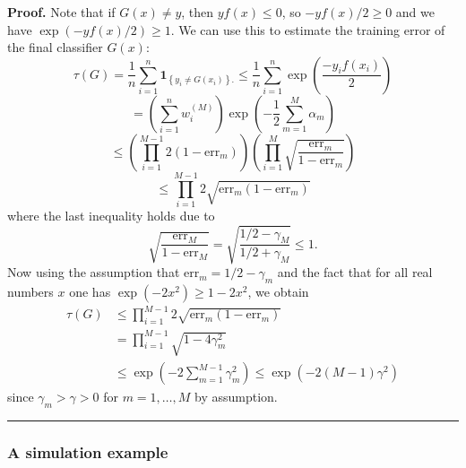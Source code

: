 \documentclass[11pt,twoside]{article}%
\theoremstyle{change}
\newenvironment{proof}[1][Proof]{\textbf{#1.} }{\ \rule{0.5em}{0.5em}}
\begin{document}
\begin{proof}
Note that if $G(x)\neq y$, then $yf(x)\leq0$, so $-yf(x)/2\geq0$ and we have
$\exp\left(  -yf(x)/2\right)  \geq1$. We can use this to estimate the training
error of the final classifier $G(x)$:%
\[
\tau(G)=\frac{1}{n}\sum_{i=1}^{n}\mathbf{1}_{\left\{  y_{i}\neq G(x_{i}%
)\right\}  .}\leq\frac{1}{n}\sum_{i=1}^{n}\exp\left(  \frac{-y_{i}f(x_{i})}%
{2}\right)
\]%
\[
=\left(  \sum_{i=1}^{n}w_{i}^{(M)}\right)  \exp\left(  -\frac{1}{2}\sum
_{m=1}^{M}\alpha_{m}\right)
\]%
\[
\leq\left(
{\displaystyle\prod\limits_{i=1}^{M-1}}
2\left(  1-\mathrm{err}_{m}\right)  \right)  \left(
{\displaystyle\prod\limits_{i=1}^{M}}
\sqrt{\frac{\mathrm{err}_{m}}{1-\mathrm{err}_{m}}}\right)
\]%
\[
\leq%
{\displaystyle\prod\limits_{i=1}^{M-1}}
2\sqrt{\mathrm{err}_{m}\left(  1-\mathrm{err}_{m}\right)  }%
\]
where the last inequality holds due to
\[
\sqrt{\frac{\mathrm{err}_{M}}{1-\mathrm{err}_{M}}}=\sqrt{\frac{1/2-\gamma_{M}%
}{1/2+\gamma_{M}}}\leq1.
\]
Now using the assumption that $\mathrm{err}_{m}=1/2-\gamma_{m}$ and the fact
that for all real numbers $x$ one has $\exp\left(  -2x^{2}\right)
\geq1-2x^{2}$, we obtain
\begin{align*}
\tau(G)  & \leq%
{\displaystyle\prod\limits_{i=1}^{M-1}}
2\sqrt{\mathrm{err}_{m}\left(  1-\mathrm{err}_{m}\right)  }\\
& =%
{\displaystyle\prod\limits_{i=1}^{M-1}}
\sqrt{1-4\gamma_{m}^{2}}\\
& \leq\exp\left(  -2\sum_{m=1}^{M-1}\gamma_{m}^{2}\right)  \leq\exp\left(
-2(M-1)\gamma^{2}\right)
\end{align*}
since $\gamma_{m}>\gamma>0$ for $m=1,\ldots,M$ by assumption.
\end{proof}

\subsubsection{A simulation example}
\end{document}
